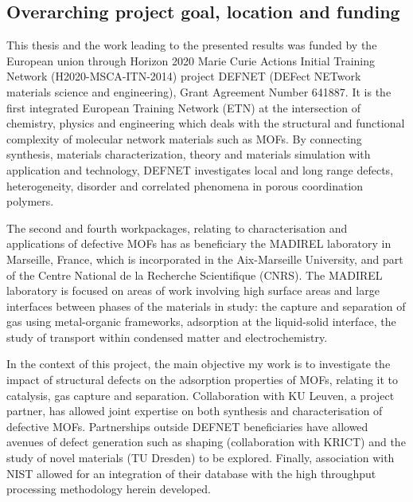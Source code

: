 \subsection*{Overarching project goal, location and funding}

This thesis and the work leading to the presented results 
was funded by the European union through Horizon 2020 Marie Curie
Actions Initial Training Network (H2020-MSCA-ITN-2014)
project DEFNET (DEFect NETwork materials science and engineering), 
Grant Agreement Number 641887. It is the first integrated 
European Training Network (ETN) at the intersection
of chemistry, physics and engineering which deals with the structural and
functional complexity of molecular network materials such as \glspl{MOF}. 
By connecting synthesis, materials characterization,
theory and materials simulation with application and technology, 
DEFNET investigates local and long range defects, heterogeneity, 
disorder and correlated phenomena in porous coordination polymers.

The second and fourth workpackages, relating to characterisation and
applications of defective \glspl{MOF} has as beneficiary the MADIREL 
laboratory in Marseille, France, which is incorporated in the
Aix-Marseille University, and part of the Centre
National de la Recherche Scientifique (CNRS). The MADIREL 
laboratory is focused on areas of work involving high surface
areas and large interfaces between phases of the materials in 
study: the capture and separation of gas using metal-organic 
frameworks, adsorption at the liquid-solid interface,
the study of transport within condensed matter and electrochemistry.

In the context of this project, the main objective my work is to
investigate the impact of structural defects on the adsorption
properties of \glspl{MOF}, relating it to catalysis, gas capture
and separation. Collaboration with KU Leuven, a project partner,
has allowed joint expertise on both synthesis and characterisation
of defective \glspl{MOF}. Partnerships outside DEFNET beneficiaries have
allowed avenues of defect generation such as shaping
(collaboration with KRICT) and the study of novel materials 
(TU Dresden) to be explored. Finally, association with NIST allowed 
for an integration of their database with the high throughput 
processing methodology herein developed.

\pagebreak


